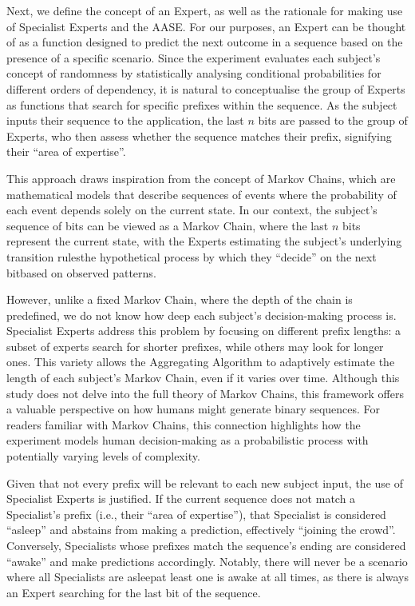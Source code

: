 Next, we define the concept of an Expert, as well as the rationale for making use of Specialist Experts and the AASE. For our purposes, an Expert can be thought of as a function designed to predict the next outcome in a sequence based on the presence of a specific scenario. Since the experiment evaluates each subject's concept of randomness by statistically analysing conditional probabilities for different orders of dependency, it is natural to conceptualise the group of Experts as functions that search for specific prefixes within the sequence. As the subject inputs their sequence to the application, the last $n$ bits are passed to the group of Experts, who then assess whether the sequence matches their prefix, signifying their ``area of expertise''.

This approach draws inspiration from the concept of Markov Chains, which are mathematical models that describe sequences of events where the probability of each event depends solely on the current state. In our context, the subject's sequence of bits can be viewed as a Markov Chain, where the last $n$ bits represent the current state, with the Experts estimating the subject's underlying transition rules\textemdash{}the hypothetical process by which they ``decide'' on the next bit\textemdash{}based on observed patterns.

However, unlike a fixed Markov Chain, where the depth of the chain is predefined, we do not know how deep each subject's decision-making process is. Specialist Experts address this problem by focusing on different prefix lengths: a subset of experts search for shorter prefixes, while others may look for longer ones. This variety allows the Aggregating Algorithm to adaptively estimate the length of each subject's Markov Chain, even if it varies over time. Although this study does not delve into the full theory of Markov Chains, this framework offers a valuable perspective on how humans might generate binary sequences. For readers familiar with Markov Chains, this connection highlights how the experiment models human decision-making as a probabilistic process with potentially varying levels of complexity.

Given that not every prefix will be relevant to each new subject input, the use of Specialist Experts is justified. If the current sequence does not match a Specialist's prefix (i.e., their ``area of expertise''), that Specialist is considered ``asleep'' and abstains from making a prediction, effectively ``joining the crowd''. Conversely, Specialists whose prefixes match the sequence's ending are considered ``awake'' and make predictions accordingly. Notably, there will never be a scenario where all Specialists are asleep\textemdash{}at least one is awake at all times, as there is always an Expert searching for the last bit of the sequence.


